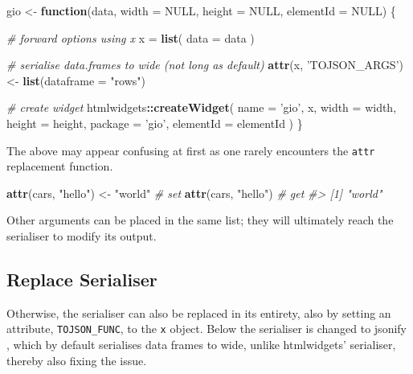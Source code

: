 \documentclass[10pt,]{krantz}
\makeatletter
\newenvironment{Shaded}{\begin{snugshade}}{\end{snugshade}}
\newcommand{\CommentTok}[1]{\textcolor[rgb]{0.37,0.37,0.37}{\textit{#1}}}
\newcommand{\ControlFlowTok}[1]{\textcolor[rgb]{0.27,0.27,0.27}{\textbf{#1}}}
\newcommand{\DataTypeTok}[1]{\textcolor[rgb]{0.27,0.27,0.27}{#1}}
\newcommand{\KeywordTok}[1]{\textcolor[rgb]{0.27,0.27,0.27}{\textbf{#1}}}
\newcommand{\NormalTok}[1]{#1}
\newcommand{\OperatorTok}[1]{\textcolor[rgb]{0.43,0.43,0.43}{\textbf{#1}}}
\newcommand{\OtherTok}[1]{\textcolor[rgb]{0.37,0.37,0.37}{#1}}
\newcommand{\StringTok}[1]{\textcolor[rgb]{0.5,0.5,0.5}{#1}}
\newenvironment{kframe}{%
\medskip{}
\setlength{\fboxsep}{.8em}
 \def\at@end@of@kframe{}%
 \ifinner\ifhmode%
  \def\at@end@of@kframe{\end{minipage}}%
  \begin{minipage}{\columnwidth}%
 \fi\fi%
 \def\FrameCommand##1{\hskip\@totalleftmargin \hskip-\fboxsep
 \colorbox{shadecolor}{##1}\hskip-\fboxsep
     \hskip-\linewidth \hskip-\@totalleftmargin \hskip\columnwidth}%
 \MakeFramed {\advance\hsize-\width
   \@totalleftmargin\z@ \linewidth\hsize
   \@setminipage}}%
 {\par\unskip\endMakeFramed%
 \at@end@of@kframe}
\renewenvironment{Shaded}{\begin{kframe}}{\end{kframe}}
\makeatother
\begin{document}
\begin{Shaded}
\begin{Highlighting}[]
\NormalTok{gio <-}\StringTok{ }\ControlFlowTok{function}\NormalTok{(data, }\DataTypeTok{width =} \OtherTok{NULL}\NormalTok{, }\DataTypeTok{height =} \OtherTok{NULL}\NormalTok{, }
  \DataTypeTok{elementId =} \OtherTok{NULL}\NormalTok{) \{}

  \CommentTok{# forward options using x}
\NormalTok{  x =}\StringTok{ }\KeywordTok{list}\NormalTok{(}
    \DataTypeTok{data =}\NormalTok{ data}
\NormalTok{  )}

  \CommentTok{# serialise data.frames to wide (not long as default)}
  \KeywordTok{attr}\NormalTok{(x, }\StringTok{'TOJSON_ARGS'}\NormalTok{) <-}\StringTok{ }\KeywordTok{list}\NormalTok{(}\DataTypeTok{dataframe =} \StringTok{"rows"}\NormalTok{)}

  \CommentTok{# create widget}
\NormalTok{  htmlwidgets}\OperatorTok{::}\KeywordTok{createWidget}\NormalTok{(}
    \DataTypeTok{name =} \StringTok{'gio'}\NormalTok{,}
\NormalTok{    x,}
    \DataTypeTok{width =}\NormalTok{ width,}
    \DataTypeTok{height =}\NormalTok{ height,}
    \DataTypeTok{package =} \StringTok{'gio'}\NormalTok{,}
    \DataTypeTok{elementId =}\NormalTok{ elementId}
\NormalTok{  )}
\NormalTok{\}}
\end{Highlighting}
\end{Shaded}

The above may appear confusing at first as one rarely encounters the \texttt{attr} replacement function.

\begin{Shaded}
\begin{Highlighting}[]
\KeywordTok{attr}\NormalTok{(cars, }\StringTok{"hello"}\NormalTok{) <-}\StringTok{ "world"} \CommentTok{# set }
\KeywordTok{attr}\NormalTok{(cars, }\StringTok{"hello"}\NormalTok{) }\CommentTok{# get }
\CommentTok{#> [1] "world"}
\end{Highlighting}
\end{Shaded}

Other arguments can be placed in the same list; they will ultimately reach the serialiser to modify its output.

\hypertarget{widgets-full-transform-data-replace}{%
\subsection{Replace Serialiser}\label{widgets-full-transform-data-replace}}

Otherwise, the serialiser can also be replaced in its entirety, also by setting an attribute, \texttt{TOJSON\_FUNC}, to the \texttt{x} object. Below the serialiser is changed to jsonify \citep{R-jsonify}, which by default serialises data frames to wide, unlike htmlwidgets' serialiser, thereby also fixing the issue.
\end{document}
